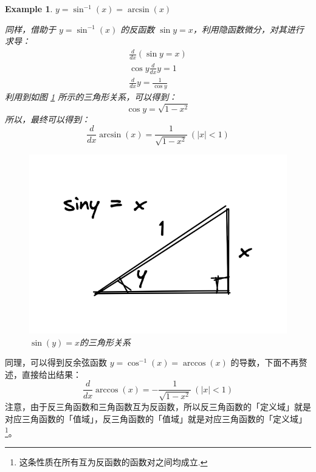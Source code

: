 \documentclass{ctexart}
\numberwithin{equation}{section}
\numberwithin{figure}{section}
\newtheorem{myEx}{Example}[section] %
\begin{document}
\begin{myEx}
    \(y = \sin^{-1}(x) = \arcsin(x)\)

    同样，借助于 \(y = \sin^{-1}(x)\) 的反函数 \(\sin y = x\)，利用隐函数微分，对其进行求导：
    \begin{align*}
        \frac{d}{dx}\left(\sin y = x\right) \\
        \cos y \frac{d}{dx}y = 1            \\
        \frac{d}{dx}y = \frac{1}{\cos y}
    \end{align*}
    利用到如图 \ref{fig:Derivativeofarcsinx} 所示的三角形关系，可以得到：
    \begin{equation*}
        \cos y = \sqrt{1 - x^2}
    \end{equation*}
    所以，最终可以得到：
    \begin{equation}
        \frac{d}{dx}\arcsin(x) = \frac{1}{\sqrt{1 - x^2}}\ (\left|x\right| < 1)
    \end{equation}
    \begin{figure}[H]
        \centering
        \includegraphics[scale=0.5]{images/Derivativeofarcsinx.png}
        \caption{\(\sin(y) = x\)的三角形关系}
        \label{fig:Derivativeofarcsinx}
    \end{figure}
\end{myEx}
同理，可以得到反余弦函数 \(y = \cos^{-1}(x) = \arccos(x)\) 的导数，下面不再赘述，直接给出结果：
\begin{equation}
    \frac{d}{dx}\arccos(x) = -\frac{1}{\sqrt{1-x^{2}}}\ (\left|x\right| < 1)
\end{equation}
注意，由于反三角函数和三角函数互为反函数，所以反三角函数的「定义域」就是对应三角函数的「值域」，反三角函数的「值域」就是对应三角函数的「定义域」\footnote{这条性质在所有互为反函数的函数对之间均成立.}。
\end{document}
